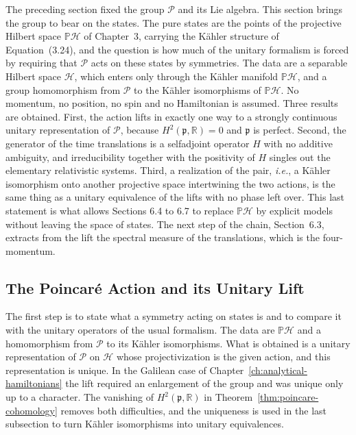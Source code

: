 The preceding section fixed the group $\mathcal{P}$ and its Lie algebra. This section brings the group to bear on the states. The pure states are the points of the projective Hilbert space $\mathbb{P}\mathcal{H}$ of Chapter~3, carrying the Kähler structure of Equation~(3.24), and the question is how much of the unitary formalism is forced by requiring that $\mathcal{P}$ acts on these states by symmetries. The data are a separable Hilbert space $\mathcal{H}$, which enters only through the Kähler manifold $\mathbb{P}\mathcal{H}$, and a group homomorphism from $\mathcal{P}$ to the Kähler isomorphisms of $\mathbb{P}\mathcal{H}$. No momentum, no position, no spin and no Hamiltonian is assumed. Three results are obtained. First, the action lifts in exactly one way to a strongly continuous unitary representation of $\mathcal{P}$, because $H^2(\mathfrak{p},\mathbb{R})=0$ and $\mathfrak{p}$ is perfect. Second, the generator of the time translations is a selfadjoint operator $H$ with no additive ambiguity, and irreducibility together with the positivity of $H$ singles out the elementary relativistic systems. Third, a realization of the pair, \textit{i.e.}, a Kähler isomorphism onto another projective space intertwining the two actions, is the same thing as a unitary equivalence of the lifts with no phase left over. This last statement is what allows Sections 6.4 to 6.7 to replace $\mathbb{P}\mathcal{H}$ by explicit models without leaving the space of states. The next step of the chain, Section~6.3, extracts from the lift the spectral measure of the translations, which is the four-momentum.

\subsection{The Poincar\'e Action and its Unitary Lift}

The first step is to state what a symmetry acting on states is and to compare it with the unitary operators of the usual formalism. The data are $\mathbb{P}\mathcal{H}$ and a homomorphism from $\mathcal{P}$ to its Kähler isomorphisms. What is obtained is a unitary representation of $\mathcal{P}$ on $\mathcal{H}$ whose projectivization is the given action, and this representation is unique. In the Galilean case of Chapter~\ref{ch:analytical-hamiltonians} the lift required an enlargement of the group and was unique only up to a character. The vanishing of $H^2(\mathfrak{p},\mathbb{R})$ in Theorem~\ref{thm:poincare-cohomology} removes both difficulties, and the uniqueness is used in the last subsection to turn Kähler isomorphisms into unitary equivalences.

